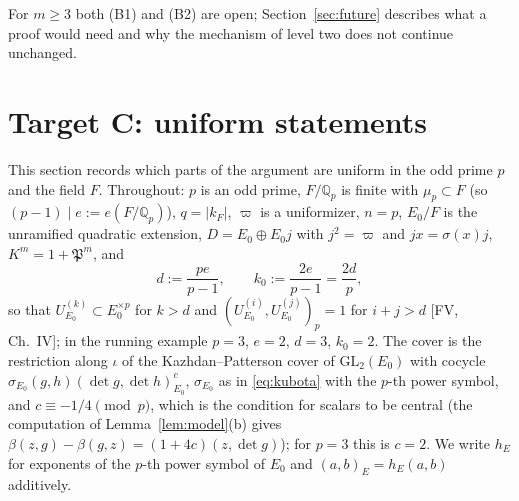 \documentclass[11pt]{article}
\newcommand{\Q}{\mathbb Q}
\newcommand{\Pfr}{\mathfrak P}
\theoremstyle{plain}
\theoremstyle{definition}
\begin{document}
For $m\ge3$ both (B1) and (B2) are open; Section~\ref{sec:future}
describes what a proof would need and why the mechanism of level two
does not continue unchanged.

\section{Target C: uniform statements}\label{sec:targetC}
This section records which parts of the argument are uniform in the
odd prime $p$ and the field $F$.  Throughout: $p$ is an odd prime,
$F/\Q_p$ is finite with $\mu_p\subset F$ (so $(p-1)\mid e:=e(F/\Q_p)$),
$q=|k_F|$, $\varpi$ is a uniformizer, $n=p$, $E_0/F$ is the unramified
quadratic extension, $D=E_0\oplus E_0j$ with $j^2=\varpi$ and
$jx=\sigma(x)j$, $K^m=1+\Pfr^m$, and
\begin{equation}\label{eq:dgen}
 d:=\frac{pe}{p-1},\qquad k_0:=\frac{2e}{p-1}=\frac{2d}{p},
\end{equation}
so that $U^{(k)}_{E_0}\subset E_0^{\times p}$ for $k>d$ and
$(U^{(i)}_{E_0},U^{(j)}_{E_0})_p=1$ for $i+j>d$ [FV, Ch.~IV]; in the
running example $p=3$, $e=2$, $d=3$, $k_0=2$.  The cover is the
restriction along $\iota$ of the Kazhdan--Patterson cover of
$\mathrm{GL}_2(E_0)$ with cocycle $\sigma_{E_0}(g,h)(\det g,\det h)^{c}_{E_0}$,
$\sigma_{E_0}$ as in \eqref{eq:kubota} with the $p$-th power symbol,
and $c\equiv-1/4\pmod p$, which is the condition for scalars to be
central (the computation of Lemma~\ref{lem:model}(b) gives
$\beta(z,g)-\beta(g,z)=(1+4c)(z,\det g)$); for $p=3$ this is $c=2$.  We
write $h_E$ for exponents of the $p$-th power symbol of $E_0$ and
$(a,b)_E=h_E(a,b)$ additively.
\end{document}
